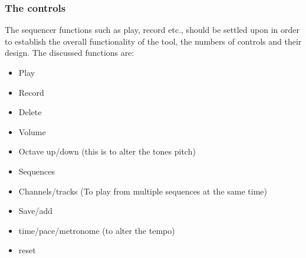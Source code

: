 \subsubsection{The controls} 
The sequencer functions such as play, record etc., should be settled upon in order to establish the overall functionality of the tool, the numbers of controls and their design. The discussed functions are:  

\begin{itemize}
	\item Play 
	\item Record 
	\item Delete
	\item Volume
	\item Octave up/down (this is to alter the tones pitch)
	\item Sequences
	\item Channels/tracks (To play from multiple sequences at the same time)
	\item Save/add
	\item time/pace/metronome (to alter the tempo)
	\item reset
\end{itemize}   

